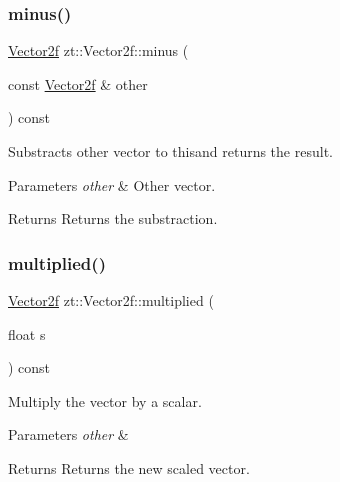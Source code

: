 \subsubsection{\texorpdfstring{minus()}{minus()}}
{\footnotesize\ttfamily \hyperlink{classzt_1_1_vector2f}{Vector2f} zt\+::\+Vector2f\+::minus (\begin{DoxyParamCaption}\item[{const \hyperlink{classzt_1_1_vector2f}{Vector2f} \&}]{other }\end{DoxyParamCaption}) const}



Substracts other vector to thisand returns the result. 


\begin{DoxyParams}{Parameters}
{\em other} & Other vector. \\
\hline
\end{DoxyParams}
\begin{DoxyReturn}{Returns}
Returns the substraction. 
\end{DoxyReturn}
\mbox{\label{classzt_1_1_vector2f_a158fe50fd17f2a0ee72a6add6a33ae93}} 
\subsubsection{\texorpdfstring{multiplied()}{multiplied()}\hspace{0.1cm}{\footnotesize\ttfamily [1/2]}}
{\footnotesize\ttfamily \hyperlink{classzt_1_1_vector2f}{Vector2f} zt\+::\+Vector2f\+::multiplied (\begin{DoxyParamCaption}\item[{float}]{s }\end{DoxyParamCaption}) const}



Multiply the vector by a scalar. 


\begin{DoxyParams}{Parameters}
{\em other} & \\
\hline
\end{DoxyParams}
\begin{DoxyReturn}{Returns}
Returns the new scaled vector. 
\end{DoxyReturn}
\mbox{\label{classzt_1_1_vector2f_aadee7c951439eb7953256e5f5704e28a}} 
